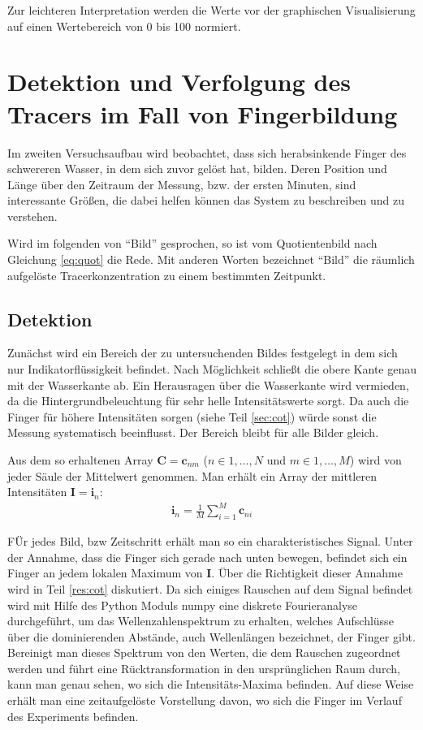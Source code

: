 Zur leichteren Interpretation werden die Werte vor der graphischen Visualisierung auf einen Wertebereich von 0 bis 100 normiert.

\section{Detektion und Verfolgung des Tracers im Fall von Fingerbildung}
\label{sec:track}
Im zweiten Versuchsaufbau wird beobachtet, dass sich herabsinkende Finger des schwereren Wasser, in dem sich zuvor \COT gelöst hat, bilden. Deren Position und Länge über den Zeitraum der Messung, bzw. der ersten Minuten, sind interessante Größen, die dabei helfen können das System zu beschreiben und zu verstehen.

Wird im folgenden von ``Bild'' gesprochen, so ist vom Quotientenbild nach Gleichung \ref{eq:quot} die Rede. Mit anderen Worten bezeichnet ``Bild'' die räumlich aufgelöste Tracerkonzentration zu einem bestimmten Zeitpunkt.

\subsection{Detektion}
\label{sec:dec}
Zunächst wird ein Bereich der zu untersuchenden Bildes festgelegt in dem sich nur Indikatorflüssigkeit befindet. Nach Möglichkeit schließt die obere Kante genau mit der Wasserkante ab. Ein Herausragen über die Wasserkante wird vermieden, da die Hintergrundbeleuchtung für sehr helle Intensitätswerte sorgt. Da auch die Finger für höhere Intensitäten sorgen (siehe Teil \ref{sec:cot}) würde sonst die Messung systematisch beeinflusst. Der Bereich bleibt für alle Bilder gleich.

Aus dem so erhaltenen Array $\mathbf{C} = \mathbf{c}_{nm}$ ($n \in 1,\dots,N$ und $m \in 1,\dots,M$) wird von jeder Säule der Mittelwert genommen. Man erhält ein Array der mittleren Intensitäten $\mathbf{I} = \mathbf{i}_{n}$:
\begin{eqnarray}
 \mathbf{i}_{n} = \frac{1}{M} \sum_{i=1}^{M} \mathbf{c}_{ni}
\end{eqnarray}

FÜr jedes Bild, bzw Zeitschritt erhält man so ein charakteristisches Signal. Unter der Annahme, dass die Finger sich gerade nach unten bewegen, befindet sich ein Finger an jedem lokalen Maximum von $\mathbf{I}$. Über die Richtigkeit dieser Annahme wird in Teil \ref{res:cot} diskutiert.
Da sich einiges Rauschen auf dem Signal befindet wird mit Hilfe des Python Moduls numpy eine diskrete Fourieranalyse durchgeführt, um das Wellenzahlenspektrum zu erhalten, welches Aufschlüsse über die dominierenden Abstände, auch Wellenlängen bezeichnet, der Finger gibt. Bereinigt man dieses Spektrum von den Werten, die dem Rauschen zugeordnet werden und führt eine Rücktransformation in den ursprünglichen Raum durch, kann man genau sehen, wo sich die Intensitäts-Maxima befinden. Auf diese Weise erhält man eine zeitaufgelöste Vorstellung davon, wo sich die Finger im Verlauf des Experiments befinden.

